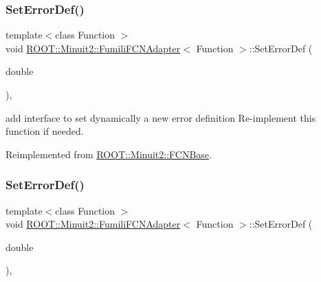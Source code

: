 \mbox{\label{classROOT_1_1Minuit2_1_1FumiliFCNAdapter_a4c854e9ce5324ee557f818ecf5f00fb1}} 
\subsubsection{\texorpdfstring{SetErrorDef()}{SetErrorDef()}\hspace{0.1cm}{\footnotesize\ttfamily [1/3]}}
{\footnotesize\ttfamily template$<$class Function $>$ \\
void \mbox{\hyperlink{classROOT_1_1Minuit2_1_1FumiliFCNAdapter}{R\+O\+O\+T\+::\+Minuit2\+::\+Fumili\+F\+C\+N\+Adapter}}$<$ Function $>$\+::Set\+Error\+Def (\begin{DoxyParamCaption}\item[{double}]{ }\end{DoxyParamCaption})\hspace{0.3cm}{\ttfamily [inline]}, {\ttfamily [virtual]}}

add interface to set dynamically a new error definition Re-\/implement this function if needed. 

Reimplemented from \mbox{\hyperlink{classROOT_1_1Minuit2_1_1FCNBase_a840e02c2e6ef96eec289deca096b6088}{R\+O\+O\+T\+::\+Minuit2\+::\+F\+C\+N\+Base}}.

\mbox{\label{classROOT_1_1Minuit2_1_1FumiliFCNAdapter_a4c854e9ce5324ee557f818ecf5f00fb1}} 
\subsubsection{\texorpdfstring{SetErrorDef()}{SetErrorDef()}\hspace{0.1cm}{\footnotesize\ttfamily [2/3]}}
{\footnotesize\ttfamily template$<$class Function $>$ \\
void \mbox{\hyperlink{classROOT_1_1Minuit2_1_1FumiliFCNAdapter}{R\+O\+O\+T\+::\+Minuit2\+::\+Fumili\+F\+C\+N\+Adapter}}$<$ Function $>$\+::Set\+Error\+Def (\begin{DoxyParamCaption}\item[{double}]{ }\end{DoxyParamCaption})\hspace{0.3cm}{\ttfamily [inline]}, {\ttfamily [virtual]}}

